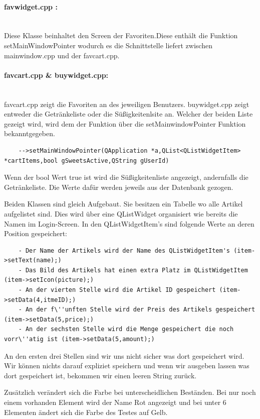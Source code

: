 \documentclass[11pt,a4paper]{article} %
\begin{document}
\paragraph{favwidget.cpp :} $\;$ \\
	Diese Klasse beinhaltet den Screen der Favoriten.Diese enthält die Funktion setMainWindowPointer wodurch es die Schnittstelle liefert zwischen mainwindow.cpp und der favcart.cpp.
\par
\paragraph{favcart.cpp \& buywidget.cpp:} $\;$ \\	
	favcart.cpp zeigt die Favoriten an des jeweiligen Benutzers. buywidget.cpp zeigt entweder die Getränkeliste oder die Süßigkeitenlsite an.
	Welcher der beiden Liste gezeigt wird, wird dem der Funktion über die setMainwindowPointer Funktion bekanntgegeben.
	
	\begin{frame}

\begin{lstlisting}
	-->setMainWindowPointer(QApplication *a,QList<QListWidgetItem> *cartItems,bool gSweetsActive,QString gUserId)
	\end{lstlisting}
\end{frame}
	Wenn der bool Wert true ist wird die Süßigkeitenliste angezeigt, andernfalls die Getränkeliste. Die Werte dafür werden jeweils aus der Datenbank gezogen.
\par	
	Beiden Klassen sind gleich Aufgebaut. Sie besitzen ein Tabelle wo alle Artikel aufgelistet sind. Dies wird über eine QListWidget organisiert wie bereits die Namen im Login-Screen.
	In den QListWidgetItem's sind folgende Werte an deren Position gespeichert:
	
	\begin{frame}

\begin{lstlisting}
	- Der Name der Artikels wird der Name des QListWidgetItem's (item->setText(name);)
	- Das Bild des Artikels hat einen extra Platz im QListWidgetItem (item->setIcon(picture);)
	- An der vierten Stelle wird die Artikel ID gespeichert (item->setData(4,itmeID);)
	- An der f\''unften Stelle wird der Preis des Artikels gespeichert (item->setData(5,price);)
	- An der sechsten Stelle wird die Menge gespeichert die noch vorr\''atig ist (item->setData(5,amount);)
	\end{lstlisting}
\end{frame}
\par
	An den ersten drei Stellen sind wir uns nicht sicher was dort gespeichert wird.
	Wir können nichts darauf expliziet speichern und wenn wir ausgeben lassen was dort gespeichert ist, bekommen wir einen leeren String zurück.
\par	
	Zusätzlich verändert sich die Farbe bei unterscheidlichen Beständen. Bei nur noch einem vorhanden Element wird der Name Rot angezeigt und bei unter 6 Elementen ändert sich die Farbe des Testes auf Gelb.
\par	
\end{document}
